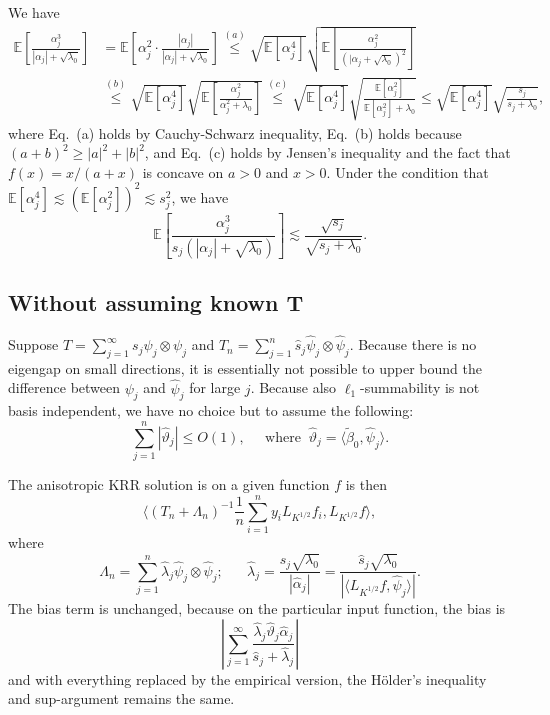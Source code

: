 \documentclass[11pt,a4paper]{article}
\renewcommand{\hat}{\widehat}
\renewcommand{\tilde}{\widetilde}
\theoremstyle{definition}
\theoremstyle{plain}
\theoremstyle{remark}
\begin{document}
We have
\begin{align*}
\mathbb E\left[\frac{\alpha_j^3}{|\alpha_j|+\sqrt{\lambda_0}}\right] &= \mathbb E\left[\alpha_j^2\cdot \frac{|\alpha_j|}{|\alpha_j|+\sqrt{\lambda_0}}\right] \overset{(a)}{\leq} \sqrt{\mathbb E[\alpha_j^4]}\sqrt{\mathbb E\left[\frac{\alpha_j^2}{(|\alpha_j+\sqrt{\lambda_0})^2}\right]}\\
&\overset{(b)}{\leq} \sqrt{\mathbb E[\alpha_j^4]}\sqrt{\mathbb E\left[\frac{\alpha_j^2}{\alpha_j^2+\lambda_0}\right]}
\overset{(c)}{\leq} \sqrt{\mathbb E[\alpha_j^4]}\sqrt{\frac{\mathbb E[\alpha_j^2]}{\mathbb E[\alpha_j^2]+\lambda_0}} \leq \sqrt{\mathbb E[\alpha_j^4]}\sqrt{\frac{s_j}{s_j+\lambda_0}},
\end{align*}
where Eq.~(a) holds by Cauchy-Schwarz inequality, Eq.~(b) holds because $(a+b)^2\geq |a|^2+|b|^2$, and Eq.~(c) holds by Jensen's inequality and the fact that $f(x)=x/(a+x)$ is concave on $a>0$ and $x>0$.
{\color{red} Under the condition that $\mathbb E[\alpha_j^4] \lesssim (\mathbb E[\alpha_j^2])^2 \lesssim s_j^2$}, we have
$$
\mathbb E\left[\frac{\alpha_j^3}{s_j(|\alpha_j|+\sqrt{\lambda_0})}\right] \lesssim \frac{\sqrt{s_j}}{\sqrt{s_j+\lambda_0}}.
$$

\subsection{Without assuming known T}



Suppose $T=\sum_{j=1}^{\infty} s_j\psi_j\otimes\psi_j$ and $T_n =\sum_{j=1}^n \hat s_j\hat\psi_j\otimes\hat\psi_j$. Because there is no eigengap on small directions, it is essentially not possible to upper bound 
the difference between $\psi_j$ and $\hat\psi_j$ for large $j$. Because also $\ell_1$-summability is not basis independent, we have no choice but to assume the following:
$$
\sum_{j=1}^n |\hat\vartheta_j| \leq O(1),\;\;\;\;\;\text{where}\;\;\hat\vartheta_j = \langle\tilde\beta_0,\hat\psi_j\rangle.
$$

The anisotropic KRR solution is on a given function $f$ is then 
$$
\langle (T_n+\Lambda_n)^{-1}\frac{1}{n}\sum_{i=1}^n y_i L_{K^{1/2}}f_i, L_{K^{1/2}}f\rangle,
$$
where 
$$
\Lambda_n = \sum_{j=1}^n \hat\lambda_j\hat\psi_j\otimes\hat\psi_j;\;\;\;\;\;\; \hat\lambda_j = \frac{\hat s_j\sqrt{\lambda_0}}{|\hat\alpha_j|} = \frac{\hat s_j\sqrt{\lambda_0}}{|\langle L_{K^{1/2}}f, \hat\psi_j\rangle|}.
$$
The bias term is unchanged, because on the particular input function, the bias is
$$
\left|\sum_{j=1}^{\infty}\frac{\hat\lambda_j\hat\vartheta_j\hat\alpha_j}{\hat s_j+\hat\lambda_j}\right| 
$$
and with everything replaced by the empirical version, the H\"{o}lder's inequality and sup-argument remains the same.
\end{document}
